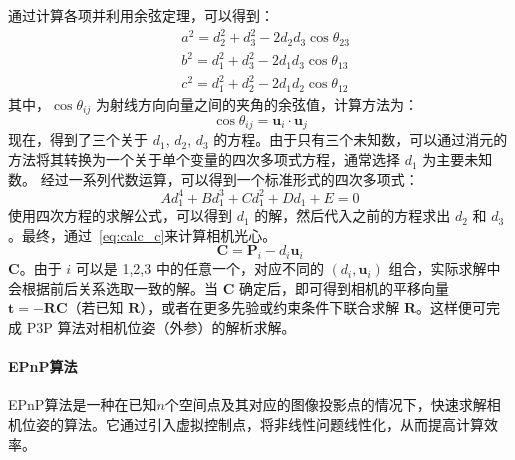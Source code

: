 通过计算各项并利用余弦定理，可以得到：
\begin{equation}
	\begin{aligned}
		& a^2 = d_2^2 + d_3^2 - 2 d_2 d_3 \cos \theta_{23} \\
		& b^2 = d_1^2 + d_3^2 - 2 d_1 d_3 \cos \theta_{13} \\
		& c^2 = d_1^2 + d_2^2 - 2 d_1 d_2 \cos \theta_{12}
	\end{aligned}
\end{equation}
其中，$\cos \theta_{ij}$ 为射线方向向量之间的夹角的余弦值，计算方法为：
\begin{equation}
	\cos \theta_{ij} = \mathbf{u}_i \cdot \mathbf{u}_j
\end{equation}
现在，得到了三个关于 $d_1$, $d_2$, $d_3$ 的方程。由于只有三个未知数，可以通过消元的方法将其转换为一个关于单个变量的四次多项式方程，通常选择 $d_1$ 为主要未知数。
经过一系列代数运算，可以得到一个标准形式的四次多项式：
\begin{equation}
	A d_1^4 + B d_1^3 + C d_1^2 + D d_1 + E = 0
\end{equation}
使用四次方程的求解公式，可以得到 $d_1$ 的解，然后代入之前的方程求出 $d_2$ 和 $d_3$。最终，通过~\ref{eq:calc_c}来计算相机光心。
\begin{equation}
	\mathbf{C} = \mathbf{P}_i - d_i \mathbf{u}_i
	\label{eq:calc_c}
\end{equation}
 $\mathbf{C}$。由于 $i$ 可以是 1,2,3 中的任意一个，对应不同的 $(d_i, \mathbf{u}_i)$ 组合，实际求解中会根据前后关系选取一致的解。当 $\mathbf{C}$ 确定后，即可得到相机的平移向量 $\mathbf{t}=-\mathbf{R}\mathbf{C}$（若已知 $\mathbf{R}$），或者在更多先验或约束条件下联合求解 $\mathbf{R}$。这样便可完成 P3P 算法对相机位姿（外参）的解析求解。


\paragraph{EPnP算法}

EPnP算法\cite{EPnP}是一种在已知$n$个空间点及其对应的图像投影点的情况下，快速求解相机位姿的算法。它通过引入虚拟控制点，将非线性问题线性化，从而提高计算效率。


